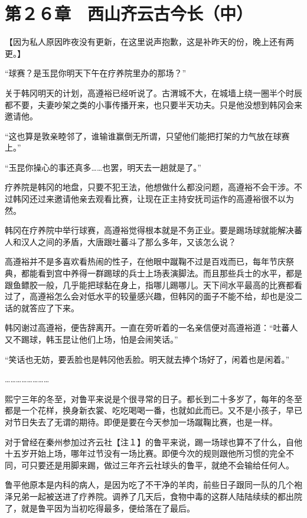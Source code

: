 \section{第２６章　西山齐云古今长（中）}

【因为私人原因昨夜没有更新，在这里说声抱歉，这是补昨天的份，晚上还有两更。】

“球赛？是玉昆你明天下午在疗养院里办的那场？”

关于韩冈明天的计划，高遵裕已经听说了。古渭城不大，在城墙上绕一圈半个时辰都不要，夫妻吵架之类的小事传播开来，也只要半天功夫。只是他没想到韩冈会来邀请他。

“这也算是敦亲睦邻了，谁输谁赢倒无所谓，只望他们能把打架的力气放在球赛上。”

“玉昆你操心的事还真多……也罢，明天去一趟就是了。”

疗养院是韩冈的地盘，只要不犯王法，他想做什么都没问题，高遵裕不会干涉。不过韩冈还过来邀请他亲去观看比赛，让现在正主持安抚司运作的高遵裕很不以为然。

韩冈在疗养院中举行球赛，高遵裕觉得根本就是不务正业。要是踢场球就能解决蕃人和汉人之间的矛盾，大唐跟吐蕃斗了那么多年，又该怎么说？

高遵裕并不是多喜欢看热闹的性子，在他眼中蹴鞠不过是百戏而已，每年节庆祭典，都能看到宫中养得一群踢球的兵士上场表演脚法。而且那些兵士的水平，都是跟鱼鳔胶一般，几乎能把球黏在身上，指哪儿踢哪儿。天下间水平最高的比赛都看过了，高遵裕怎么会对低水平的较量感兴趣，但韩冈的面子不能不给，却也是没二话的就答应了下来。

韩冈谢过高遵裕，便告辞离开。一直在旁听着的一名亲信便对高遵裕道：“吐蕃人又不踢球，韩玉昆让他们上场，怕是会闹笑话。”

“笑话也无妨，要丢脸也是韩冈他丢脸。明天就去捧个场好了，闲着也是闲着。”

……………………

熙宁三年的冬至，对鲁平来说是个很寻常的日子。都长到二十多岁了，每年的冬至都是一个花样，换身新衣裳、吃吃喝喝一番，也就如此而已。又不是小孩子，早已对节日失去了无谓的期待。即便是要在今天参加一场蹴鞠比赛，也是一样。

对于曾经在秦州参加过齐云社【注１】的鲁平来说，踢一场球也算不了什么，自他十五岁开始上场，哪年过节没有一场比赛。即便今次的规则跟他所习惯的完全不同，可只要还是用脚来踢，做过三年齐云社球头的鲁平，就绝不会输给任何人。

鲁平他原本是内科的病人，是因为吃了不干净的羊肉，前些日子跟同一队的几个袍泽兄弟一起被送进了疗养院。调养了几天后，食物中毒的这群人陆陆续续的都出院了，就是鲁平因为当初吃得最多，便给落在了最后。

